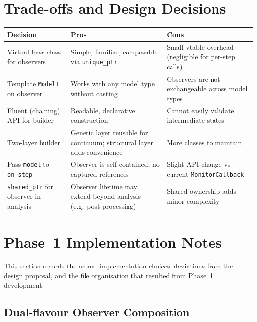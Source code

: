\section{Trade-offs and Design Decisions}
\label{sec:obs-tradeoffs}

\begin{center}
\small
\begin{tabular}{p{4cm}p{4.5cm}p{4.5cm}}
\toprule
\textbf{Decision} & \textbf{Pros} & \textbf{Cons} \\
\midrule
Virtual base class for observers &
  Simple, familiar, composable via \texttt{unique\_ptr} &
  Small vtable overhead (negligible for per-step calls) \\
\addlinespace
Template \texttt{ModelT} on observer &
  Works with any model type without casting &
  Observers are not exchangeable across model types \\
\addlinespace
Fluent (chaining) API for builder &
  Readable, declarative construction &
  Cannot easily validate intermediate states \\
\addlinespace
Two-layer builder &
  Generic layer reusable for continuum; structural layer adds convenience &
  More classes to maintain \\
\addlinespace
Pass \texttt{model} to \texttt{on\_step} &
  Observer is self-contained; no captured references &
  Slight API change vs current \texttt{MonitorCallback} \\
\addlinespace
\texttt{shared\_ptr} for observer in analysis &
  Observer lifetime may extend beyond analysis (e.g.\ post-processing) &
  Shared ownership adds minor complexity \\
\bottomrule
\end{tabular}
\end{center}


\section{Phase~1 Implementation Notes}
\label{sec:obs-implementation}

This section records the actual implementation choices, deviations from
the design proposal, and the file organisation that resulted from
Phase~1 development.

\subsection{Dual-flavour Observer Composition}
\label{sec:impl-dual-flavour}

